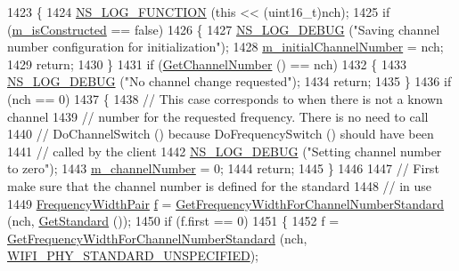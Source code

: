 \begin{DoxyCode}
1423 \{
1424   \hyperlink{log-macros-disabled_8h_a90b90d5bad1f39cb1b64923ea94c0761}{NS\_LOG\_FUNCTION} (\textcolor{keyword}{this} << (uint16\_t)nch);
1425   \textcolor{keywordflow}{if} (\hyperlink{classns3_1_1WifiPhy_a61f888ec1fe29d38d206df607596161f}{m\_isConstructed} == \textcolor{keyword}{false})
1426     \{
1427       \hyperlink{group__logging_ga413f1886406d49f59a6a0a89b77b4d0a}{NS\_LOG\_DEBUG} (\textcolor{stringliteral}{"Saving channel number configuration for initialization"});
1428       \hyperlink{classns3_1_1WifiPhy_a318e964855d1e96bfb3af870be9fc0a2}{m\_initialChannelNumber} = nch;
1429       \textcolor{keywordflow}{return};
1430     \}
1431   \textcolor{keywordflow}{if} (\hyperlink{classns3_1_1WifiPhy_a5cf0ccf06109ace61db51c83e91b7e8d}{GetChannelNumber} () == nch)
1432     \{
1433       \hyperlink{group__logging_ga413f1886406d49f59a6a0a89b77b4d0a}{NS\_LOG\_DEBUG} (\textcolor{stringliteral}{"No channel change requested"});
1434       \textcolor{keywordflow}{return};
1435     \}
1436   \textcolor{keywordflow}{if} (nch == 0)
1437     \{
1438       \textcolor{comment}{// This case corresponds to when there is not a known channel}
1439       \textcolor{comment}{// number for the requested frequency.  There is no need to call}
1440       \textcolor{comment}{// DoChannelSwitch () because DoFrequencySwitch () should have been}
1441       \textcolor{comment}{// called by the client}
1442       \hyperlink{group__logging_ga413f1886406d49f59a6a0a89b77b4d0a}{NS\_LOG\_DEBUG} (\textcolor{stringliteral}{"Setting channel number to zero"});
1443       \hyperlink{classns3_1_1WifiPhy_adb98cbe4c4c82208862a25b6ad908765}{m\_channelNumber} = 0;
1444       \textcolor{keywordflow}{return};
1445     \}
1446 
1447   \textcolor{comment}{// First make sure that the channel number is defined for the standard}
1448   \textcolor{comment}{// in use}
1449   \hyperlink{classns3_1_1WifiPhy_abb7b47ebed22c2703bcc239729d1e40c}{FrequencyWidthPair} \hyperlink{buildings__pathloss_8m_aa52d3a6e3de5a80a97c12364caeaa125}{f} = 
      \hyperlink{classns3_1_1WifiPhy_ad4ffecf66d648b47d62ad73143a3fcbc}{GetFrequencyWidthForChannelNumberStandard} (nch, 
      \hyperlink{classns3_1_1WifiPhy_af33f60586f8e0bd1763b863e7ce193b2}{GetStandard} ());
1450   \textcolor{keywordflow}{if} (f.first == 0)
1451     \{
1452       f = \hyperlink{classns3_1_1WifiPhy_ad4ffecf66d648b47d62ad73143a3fcbc}{GetFrequencyWidthForChannelNumberStandard} (nch, 
      \hyperlink{group__wifi_gga1299834f4e1c615af3ca738033b76a49a95f590f4512ff9645bba0b4f2650f92d}{WIFI\_PHY\_STANDARD\_UNSPECIFIED});

\end{DoxyCode}
